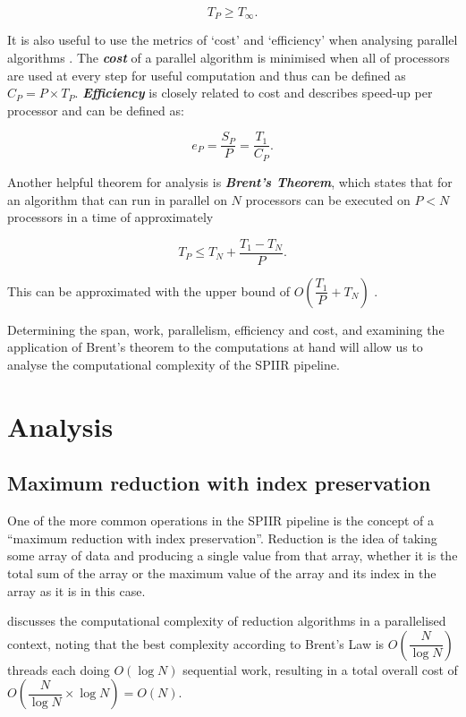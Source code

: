 \documentclass{article}
\begin{document}
\[
    T_P \geq T_\infty.
\]

It is also useful to use the metrics of `cost' and `efficiency' when analysing parallel algorithms \cite{brent}.
The \textit{\textbf{cost}} of a parallel algorithm is minimised when all of processors are used at every step for useful computation and thus can be defined as \(C_P = P\times{T_P}\).
\textit{\textbf{Efficiency}} is closely related to cost and describes speed-up per processor and can be defined as:

\[
    e_P = \dfrac{S_P}{P} = \dfrac{T_1}{C_P}.
\]

Another helpful theorem for analysis is \textit{\textbf{Brent's Theorem}}, which states that for an algorithm that can run in parallel on \(N\) processors can be executed on \(P < N\) processors in a time of approximately \cite{BrentsLaw}

\[
    T_P \leq T_N + \dfrac{T_1-T_N}{P}.
\]

This can be approximated with the upper bound of \(O(\dfrac{T_1}{P} + T_N)\) \cite{brent}.

Determining the span, work, parallelism, efficiency and cost, and examining the application of Brent's theorem to the computations at hand will allow us to analyse the computational complexity of the SPIIR pipeline.

\section{Analysis} \label{sec:analysis}
\subsection{Maximum reduction with index preservation} \label{sec:reduce}

One of the more common operations in the SPIIR pipeline is the concept of a ``maximum reduction with index preservation''.
Reduction is the idea of taking some array of data and producing a single value from that array, whether it is the total sum of the array or the maximum value of the array and its index in the array as it is in this case.

\cite{reduction} discusses the computational complexity of reduction algorithms in a parallelised context, noting that the best complexity according to Brent's Law is \(O(\dfrac{N}{\log N})\) threads each doing \(O(\log N)\) sequential work, resulting in a total overall cost of \(O(\dfrac{N}{\log N}\times{\log N}) = O(N)\).
\end{document}
